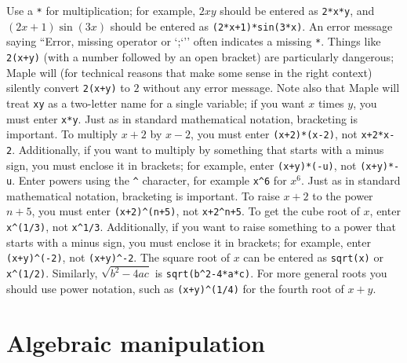 \documentclass{amsart}
\begin{document}
\begin{itemize}
  Use a \verb~*~ for multiplication; for example,
 $2xy$ should be entered as \verb~2*x*y~, and $(2x+1)\sin(3x)$
 should be entered as \verb~(2*x+1)*sin(3*x)~. 
%
 An error message saying ``Error, missing operator or `;`''
 often indicates a missing \verb~*~.  Things like
 \verb~2(x+y)~ (with a number followed by an open bracket)
 are particularly dangerous; Maple will (for technical
 reasons that make some sense in the right context) silently
 convert \verb~2(x+y)~ to $2$ without any error message. 
%
 Note also that Maple will treat \verb~xy~ as a two-letter
 name for a single variable; if you want $x$ times $y$, you
 must enter \verb~x*y~. 
%
 Just as in standard mathematical notation, bracketing is
 important.  To multiply $x+2$ by $x-2$, you must enter
 \verb~(x+2)*(x-2)~, not \verb~x+2*x-2~.  
%
 Additionally, if you want to multiply
 by something that starts with a minus sign, you must
 enclose it in brackets; for example, enter
 \verb~(x+y)*(-u)~, not \verb~(x+y)*-u~. 
%
  Enter powers using the \verb~^~ character,
 for example \verb~x^6~ for $x^6$. 
%
 Just as in standard mathematical notation, bracketing is
 important.  To raise $x+2$ to the power $n+5$, you must
 enter \verb~(x+2)^(n+5)~, not \verb~x+2^n+5~.  To get the
 cube root of $x$, enter \verb~x^(1/3)~, not
 \verb~x^1/3~.  
%
 Additionally, if you want to raise something to a power
 that starts with a minus sign, you must enclose it in
 brackets; for example, enter \verb~(x+y)^(-2)~, not
 \verb~(x+y)^-2~. 
%
  The square root of $x$ can be entered as
 \verb~sqrt(x)~ or \verb~x^(1/2)~.  Similarly,
 $\sqrt{b^2-4ac}$ is \verb~sqrt(b^2-4*a*c)~.  For more
 general roots you should use power notation, such as
 \verb~(x+y)^(1/4)~ for the fourth root of $x+y$. 
\end{itemize}

\section{Algebraic manipulation}
\setcounter{notecounter}{0}
\end{document}

